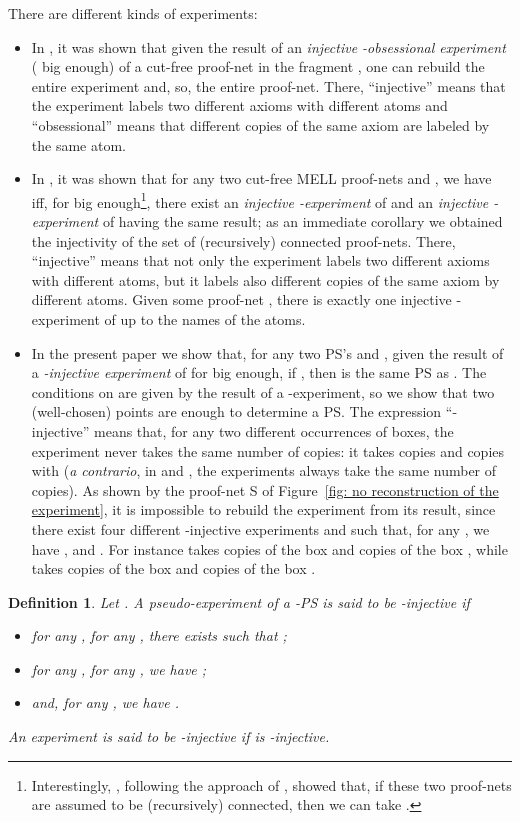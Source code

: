 \documentclass{article}
\theoremstyle{plain}
\newtheorem{definition}{Definition}
\begin{document}
There are different kinds of experiments:
\begin{itemize}
\item In \cite{injectcoh}, it was shown that given the result of an \emph{injective -obsessional experiment} ( big enough) of a cut-free proof-net in the fragment , one can rebuild the entire experiment and, so, the entire proof-net. There, ``injective'' means that the experiment labels two different axioms with different atoms and ``obsessional'' means that different copies of the same axiom are labeled by the same atom.\item In \cite{LPSinjectivity}, it was shown that for any two cut-free MELL proof-nets  and , we have  iff, for  big enough\footnote{Interestingly, \cite{k=2}, following the approach of \cite{LPSinjectivity}, showed that, if these two proof-nets are assumed to be (recursively) connected, then we can take .}, there exist an \emph{injective -experiment} of  and an \emph{injective -experiment} of  having the same result; as an immediate corollary we obtained the injectivity of the set of (recursively) connected proof-nets. There, ``injective'' means that not only the experiment labels two different axioms with different atoms, but it labels also different copies of the same axiom by different atoms. Given some proof-net , there is exactly one injective -experiment of  up to the names of the atoms.
\item In the present paper we show that, for any two PS's  and , given the result  of a \emph{-injective experiment} of  for  big enough, if , then  is the same PS as . The conditions on  are given by the result of a -experiment, so we show that two (well-chosen) points are enough to determine a PS. The expression ``-injective'' means that, for any two different occurrences of boxes, the experiment never takes the same number of copies: it takes  copies and  copies with  (\emph{a contrario}, in \cite{injectcoh} and \cite{LPSinjectivity}, the experiments always take the same number of copies). As shown by the proof-net S of Figure~\ref{fig: no reconstruction of the experiment}, it is impossible to rebuild the experiment from its result, since there exist four different -injective experiments  and  such that, for any , we have ,  and . For instance  takes  copies of the box  and  copies of the box , while  takes  copies of the box  and  copies of the box .
\end{itemize}

\begin{definition}\label{defin: k-injective}
Let . A pseudo-experiment  of a -PS  is said to be \emph{-injective} if
\begin{itemize}
\item for any , for any , there exists  such that ;
\item for any , for any , we have  ;
\item and, for any , we have .
\end{itemize}
An experiment  is said to be \emph{-injective} if  is -injective.
\end{definition}
\end{document}
